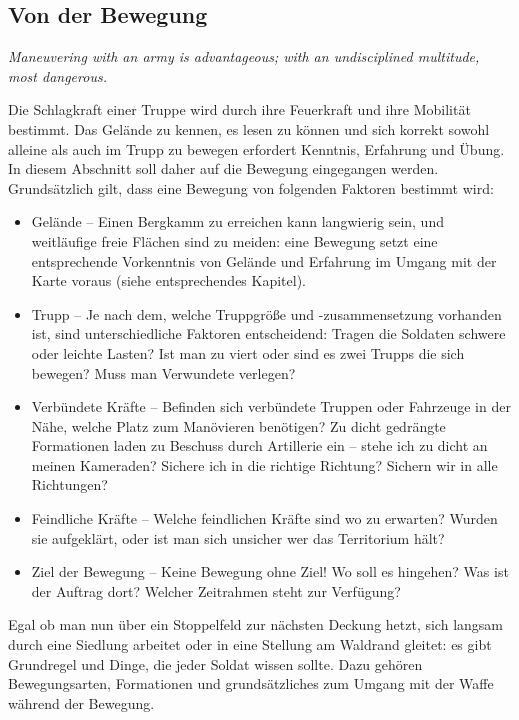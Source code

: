 \newpage
\subsection{Von der Bewegung}
\centerline{\textit{Maneuvering with an army is advantageous; with an undisciplined multitude, most dangerous.}}
Die Schlagkraft einer Truppe wird durch ihre Feuerkraft und ihre Mobilität bestimmt. Das Gelände zu kennen, es lesen zu können und sich korrekt sowohl alleine als auch im Trupp zu bewegen erfordert Kenntnis, Erfahrung und Übung. In diesem Abschnitt soll daher auf die Bewegung eingegangen werden.
\\Grundsätzlich gilt, dass eine Bewegung von folgenden Faktoren bestimmt wird:
\begin{itemize}
	\item Gelände -- Einen Bergkamm zu erreichen kann langwierig sein, und weitläufige freie Flächen sind zu meiden: eine Bewegung setzt eine entsprechende Vorkenntnis von Gelände und Erfahrung im Umgang mit der Karte voraus (siehe entsprechendes Kapitel).
	\item Trupp -- Je nach dem, welche Truppgröße und -zusammensetzung vorhanden ist, sind unterschiedliche Faktoren entscheidend: Tragen die Soldaten schwere oder leichte Lasten? Ist man zu viert oder sind es zwei Trupps die sich bewegen? Muss man Verwundete verlegen? 
	\item Verbündete Kräfte -- Befinden sich verbündete Truppen oder Fahrzeuge in der Nähe, welche Platz zum Manövieren benötigen? Zu dicht gedrängte Formationen laden zu Beschuss durch Artillerie ein -- stehe ich zu dicht an meinen Kameraden? Sichere ich in die richtige Richtung? Sichern wir in alle Richtungen?
	\item Feindliche Kräfte -- Welche feindlichen Kräfte sind wo zu erwarten? Wurden sie aufgeklärt, oder ist man sich unsicher wer das Territorium hält?
	\item Ziel der Bewegung -- Keine Bewegung ohne Ziel! Wo soll es hingehen? Was ist der Auftrag dort? Welcher Zeitrahmen steht zur Verfügung?
\end{itemize}
Egal ob man nun über ein Stoppelfeld zur nächsten Deckung hetzt, sich langsam durch eine Siedlung arbeitet oder in eine Stellung am Waldrand gleitet: es gibt Grundregel und Dinge, die jeder Soldat wissen sollte. Dazu gehören Bewegungsarten, Formationen und grundsätzliches zum Umgang mit der Waffe während der Bewegung.
